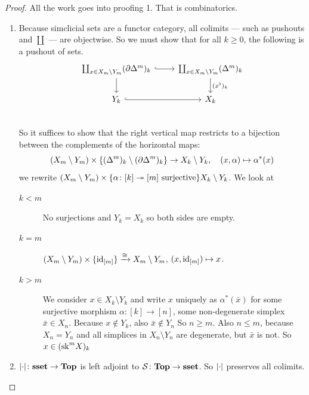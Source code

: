\documentclass[language=english]{TemplateLecture}
\begin{document}
\begin{proof}
    All the work goes into proofing 1. That is combinatorics.
    \begin{enumerate}
        \item Because simclicial sets are a functor category, all colimits --- such as pushouts and \(\coprod\) --- are objectwise. So we must show that for all \(k \geq 0\), the following is a pushout of sets.
        \[\begin{tikzcd}
            \coprod_{x \in X_m \setminus Y_m} (\partial\Delta^m)_k \ar[r, hook] \ar[d] & \coprod_{x \in X_m \setminus Y_m} (\Delta^m)_k \ar[d, "(x^\flat)_k"] \\
            Y_k \ar[r, hook] & X_k \\
        \end{tikzcd}\]
        So it suffices to show that the right vertical map restricts to a bijection between the complements of the horizontal maps:
        \[(X_m\setminus Y_m) \times \{(\Delta^m)_k\setminus (\partial\Delta^m)_k\} \to X_k \setminus Y_k, \quad (x, \alpha)\mapsto \alpha^*(x)\]
        we rewrite \((X_m \setminus Y_m)\times \{\alpha\colon [k] \twoheadrightarrow [m] \text{ surjective}\} X_k\setminus Y_k\). We look at
        \begin{description}
            \item[\(k < m\)]  No surjections and \( Y_k = X_k\) so both sides are empty.
            \item[\(k = m\)] \((X_m\setminus Y_m)\times \{\operatorname{id}_{[m]}\} \xrightarrow{\cong} X_m \setminus Y_m\), \((x, \operatorname{id}_{[m]})\mapsto x\).
            \item[\(k > m\)] We consider \(x \in X_k \setminus Y_k\) and write \(x\) uniquely as \(\alpha^*(\bar x)\) for some surjective morphism \(\alpha\colon [k]\to [n]\), some non-degenerate simplex \(\bar x \in X_n\). Because \(x \not \in Y_k\), also \(\bar x \not \in Y_n\) So \(n \geq m\). Also \(n \leq m\), because \(X_n = Y_n\) and all simplices in \(X_n \setminus Y_n\) are degenerate, but \(\bar x\) is not. So \(x \in (\mathrm{sk}^m X)_k\)
        \end{description}
        \item \(\lvert\cdot\rvert\colon \mathbf{sset} \to \mathbf{Top}\) is left adjoint to \(\mathcal{S}\colon \mathbf{Top} \to \mathbf{sset}\). So \(\lvert\cdot\rvert\) preserves all colimits.
    \end{enumerate}
\end{proof}
\end{document}
